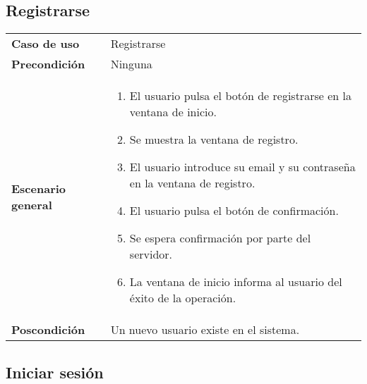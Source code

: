 

\subsection{Registrarse}

{\footnotesize
\begin{tabularx}{0.95\textwidth}{p{}|X}

\textbf{Caso de uso} & Registrarse \\

\textbf{Precondición} & Ninguna \\	

\textbf{Escenario general} & \begin{enumerate}
\item El usuario pulsa el botón de registrarse en la ventana de inicio.
\item Se muestra la ventana de registro.
\item El usuario introduce su email y su contraseña en la ventana de registro.
\item El usuario pulsa el botón de confirmación.
\item Se espera confirmación por parte del servidor.
\item La ventana de inicio informa al usuario del éxito de la operación.
\end{enumerate} \\

\textbf{Poscondición} & Un nuevo usuario existe en el sistema.

\end{tabularx}
}

\subsection{Iniciar sesión}


